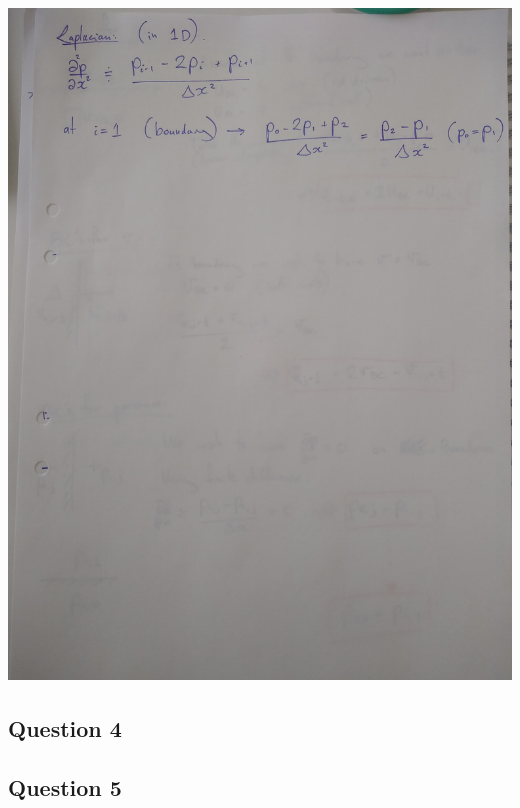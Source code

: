 \documentclass[10pt,a4paper]{article}
\begin{document}
\noindent \includegraphics[width=\textwidth]{Q3B.jpg}
\newpage



\subsection{Question 4}



\subsection{Question 5}
\end{document}
